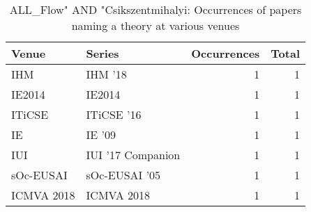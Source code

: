 \begin{table*}[t]
\begin{tabular}{llrr}
Venue & Series & Occurrences & Total\\\hline
\multirow{1}{*}{IHM } & IHM '18 & 1 & \multirow{1}{*}{1}\\
\multirow{1}{*}{IE2014} & IE2014 & 1 & \multirow{1}{*}{1}\\
\multirow{1}{*}{ITiCSE } & ITiCSE '16 & 1 & \multirow{1}{*}{1}\\
\multirow{1}{*}{IE } & IE '09 & 1 & \multirow{1}{*}{1}\\
\multirow{1}{*}{IUI } & IUI '17 Companion & 1 & \multirow{1}{*}{1}\\
\multirow{1}{*}{sOc-EUSAI } & sOc-EUSAI '05 & 1 & \multirow{1}{*}{1}\\
\multirow{1}{*}{ICMVA 2018} & ICMVA 2018 & 1 & \multirow{1}{*}{1}\\
\end{tabular}
\caption{ALL\_Flow" AND "Csikszentmihalyi: Occurrences of papers naming a theory at various venues}
\end{table*}
